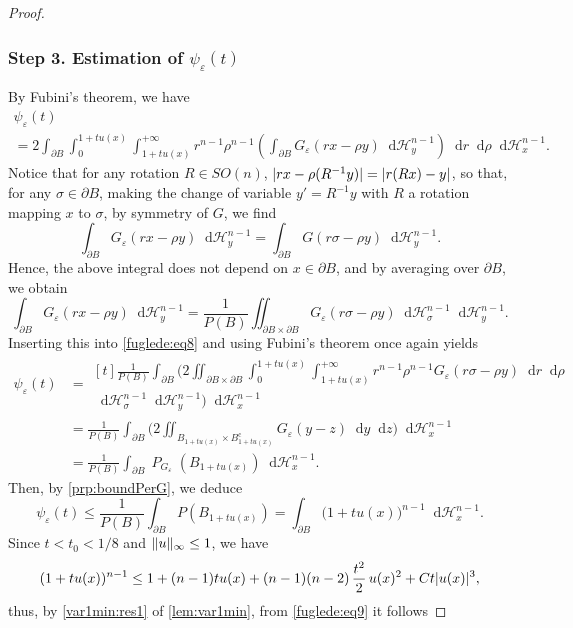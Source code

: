 \documentclass[JEP,XML,SOM,Unicode,published]{cedram}
\numberwithin{equation}{section}
\theoremstyle{plain}
\theoremstyle{definition}
\newcommand{\dd}{\mathop{}\mathopen{}\mathrm{d}}
\newcommand{\dy}{\mathop{}\mathopen{}\mathrm{d}y}
\newcommand{\dz}{\mathop{}\mathopen{}\mathrm{d}z}
\newcommand{\dr}{\mathop{}\mathopen{}\mathrm{d}r}
\newcommand{\dH}{\mathop{}\mathopen{}\mathrm{d}\mathscr{H}}
\let\eps\varepsilon
\newcommand{\compl}{{\mathrm{c}}}
\DeclareMathOperator{\Per}{\mathit{P}}
\DeclarePairedDelimiter{\abs}{\lvert}{\rvert}
\DeclarePairedDelimiter{\norm}{\lVert}{\rVert}
\begin{document}
\begin{proof}
\subsubsection*{Step 3. Estimation of $\psi_\eps(t)$}
By Fubini's theorem, we have\vspace*{-5pt}
\begin{multline}\label{fuglede:eq8}
\psi_\eps(t)\\
=2\int_{\partial B}\int_0^{1+tu(x)}\int_{1+tu(x)}^{+\infty}
r^{n-1}\rho^{n-1}\left(\int_{\partial B}G_\eps(rx-\rho y) \dH^{n-1}_y\right)
\dr\dd\rho\dH^{n-1}_x.
\end{multline}
Notice that for any rotation $R\in SO(n)$, $\abs{rx-\rho(R^{-1}y)}=\abs{r(Rx)-y}$, so that,
for any $\sigma\in\partial B$, making the change of variable $y'=R^{-1}y$ with $R$ a rotation
mapping $x$ to $\sigma$, by symmetry of $G$, we find
\[
\int_{\partial B} G_\eps(rx-\rho y)\dH_y^{n-1}
=\int_{\partial B} G(r\sigma-\rho y)\dH_y^{n-1}.
\]
Hence, the above integral does not depend on $x\in\partial B$, and by averaging over $\partial B$,
we obtain
\[
\int_{\partial B} G_\eps(rx-\rho y) \dH^{n-1}_y
=\frac{1}{P(B)}\iint_{\partial B\times\partial B} G_\eps(r\sigma-\rho y)\dH^{n-1}_\sigma\dH^{n-1}_y.
\]
Inserting this into \cref{fuglede:eq8} and using Fubini's theorem once again yields
\[
\begin{aligned}
\psi_\eps(t)
&=\begin{multlined}[t]
\frac{1}{P(B)}\int_{\partial B}
\biggl(2\iint_{\partial B\times\partial B}\int_0^{1+tu(x)}\int_{1+tu(x)}^{+\infty}
r^{n-1}\rho^{n-1}G_\eps(r\sigma-\rho y)\dr\dd\rho\\
\dH^{n-1}_\sigma\dH^{n-1}_y \biggr) \dH_x^{n-1}\end{multlined}\\
&=\frac{1}{P(B)}\int_{\partial B}
\biggl(2\iint_{B_{1+tu(x)}\times B_{1+tu(x)}^\compl}G_\eps(y-z) \dy\dz \biggr)\dH_x^{n-1}\\
&=\frac{1}{P(B)}\int_{\partial B} \Per_{G_\eps}(B_{1+tu(x)})\dH_x^{n-1}.
\end{aligned}
\]
Then, by \cref{prp:boundPerG}, we deduce
\begin{equation}\label{fuglede:eq9}
\psi_\eps(t)
\leq \frac{1}{P(B)}\int_{\partial B} P(B_{1+tu(x)})
= \int_{\partial B} \big(1+tu(x)\big)^{n-1}\dH_x^{n-1}.
\end{equation}
Since $t<t_0<1/8$ and $\norm{u}_\infty\leq 1$, we have
\[
(1+tu(x))^{n-1}\leq 1+(n-1)tu(x)+(n-1)(n-2)\,\frac{t^2}{2}\,u(x)^2+Ct\abs{u(x)}^3,
\]
thus, by \cref{var1min:res1} of \cref{lem:var1min}, from \cref{fuglede:eq9} it follows

\end{proof}
\end{document}
